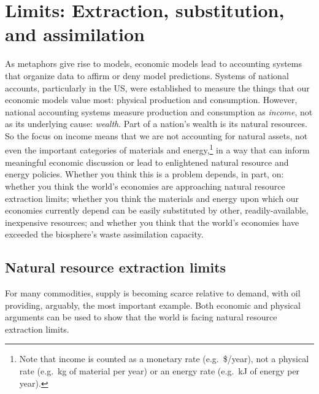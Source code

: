 \section{Limits: Extraction, substitution, and assimilation}
\label{sec:limits}

As metaphors give rise to models, 
economic models lead to accounting systems that organize data
to affirm or deny model predictions.
Systems of national accounts, 
particularly in the US, 
were established to measure the things that 
our economic models value most: 
physical production and consumption. 
However, national accounting systems measure production and consumption 
as \emph{income}, not as its underlying cause: \emph{wealth}.
Part of a nation's wealth is its natural resources.
So the focus on income means that we are not accounting for natural assets, 
not even the important categories of materials and energy,\footnote{Note that
	income is counted as a monetary rate (e.g.\ \$/year), 
	not a physical rate (e.g.\ kg of material per year)
	or an energy rate (e.g.\ kJ of energy per year).
	} 
in a way that can inform meaningful economic discussion or
lead to enlightened natural resource and energy policies.
Whether you think this is a problem depends, in part, on:
whether you think the world's economies are approaching 
	natural resource extraction limits;
whether you think the materials and energy upon which our economies currently depend
	can be easily substituted by other, readily-available, inexpensive resources; and
whether you think that the world's economies have exceeded 
	the biosphere's waste assimilation capacity.


\subsection{Natural resource extraction limits}
\label{sub:natural_resource_extraction_limits}

For many commodities, 
supply is becoming scarce relative to demand, 
with oil providing, arguably, the most important example. 
Both economic and physical arguments can be used to show that the world is facing
natural resource extraction limits.

